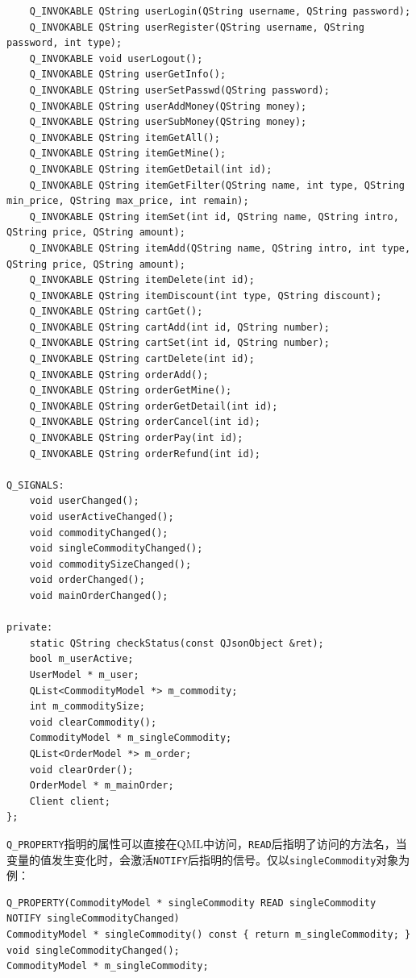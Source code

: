\documentclass[lang=cn,11pt,a4paper,cite=authornum]{paper}
\begin{document}
\begin{code}
\begin{verbatim}
    Q_INVOKABLE QString userLogin(QString username, QString password);
    Q_INVOKABLE QString userRegister(QString username, QString password, int type);
    Q_INVOKABLE void userLogout();
    Q_INVOKABLE QString userGetInfo();
    Q_INVOKABLE QString userSetPasswd(QString password);
    Q_INVOKABLE QString userAddMoney(QString money);
    Q_INVOKABLE QString userSubMoney(QString money);
    Q_INVOKABLE QString itemGetAll();
    Q_INVOKABLE QString itemGetMine();
    Q_INVOKABLE QString itemGetDetail(int id);
    Q_INVOKABLE QString itemGetFilter(QString name, int type, QString min_price, QString max_price, int remain);
    Q_INVOKABLE QString itemSet(int id, QString name, QString intro, QString price, QString amount);
    Q_INVOKABLE QString itemAdd(QString name, QString intro, int type, QString price, QString amount);
    Q_INVOKABLE QString itemDelete(int id);
    Q_INVOKABLE QString itemDiscount(int type, QString discount);
    Q_INVOKABLE QString cartGet();
    Q_INVOKABLE QString cartAdd(int id, QString number);
    Q_INVOKABLE QString cartSet(int id, QString number);
    Q_INVOKABLE QString cartDelete(int id);
    Q_INVOKABLE QString orderAdd();
    Q_INVOKABLE QString orderGetMine();
    Q_INVOKABLE QString orderGetDetail(int id);
    Q_INVOKABLE QString orderCancel(int id);
    Q_INVOKABLE QString orderPay(int id);
    Q_INVOKABLE QString orderRefund(int id);

Q_SIGNALS:
    void userChanged();
    void userActiveChanged();
    void commodityChanged();
    void singleCommodityChanged();
    void commoditySizeChanged();
    void orderChanged();
    void mainOrderChanged();

private:
    static QString checkStatus(const QJsonObject &ret);
    bool m_userActive; 
    UserModel * m_user; 
    QList<CommodityModel *> m_commodity; 
    int m_commoditySize; 
    void clearCommodity(); 
    CommodityModel * m_singleCommodity; 
    QList<OrderModel *> m_order; 
    void clearOrder(); 
    OrderModel * m_mainOrder; 
    Client client;
};
\end{verbatim}
\end{code}

\texttt{Q_PROPERTY}指明的属性可以直接在QML中访问，\texttt{READ}后指明了访问的方法名，当变量的值发生变化时，会激活\texttt{NOTIFY}后指明的信号。仅以\texttt{singleCommodity}对象为例：

\begin{code}
\begin{verbatim}
Q_PROPERTY(CommodityModel * singleCommodity READ singleCommodity NOTIFY singleCommodityChanged)
CommodityModel * singleCommodity() const { return m_singleCommodity; }
void singleCommodityChanged();
CommodityModel * m_singleCommodity; 
\end{verbatim}
\end{code}
\end{document}

